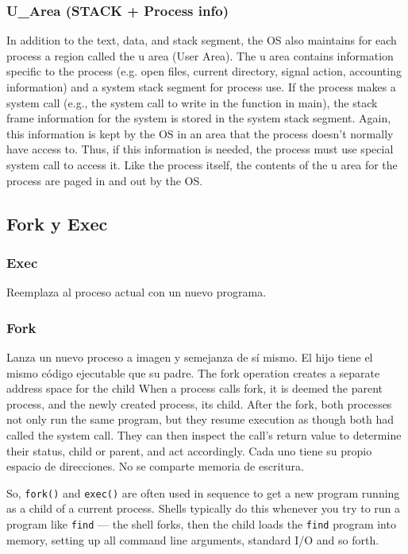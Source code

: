 \documentclass[a4paper, twoside]{article}
\begin{document}
\subsubsection{U\_Area (STACK + Process info)}

In addition to the text, data, and stack segment, the OS also maintains for
each process a region called the u area (User Area).
The u area contains information specific to the process (e.g. open files,
current directory, signal action, accounting information) and a system stack
segment for process use.
If the process makes a system call (e.g., the system call to write in the
function in main), the stack frame information for the system is stored in
the system stack segment.
Again, this information is kept by the OS in an area that the process doesn't
normally have access to.
Thus, if this information is needed, the process must use special system call
to access it.
Like the process itself, the contents of the u area for the process are paged
in and out by the OS.

\subsection{Fork y Exec}

\subsubsection{Exec}

Reemplaza al proceso actual con un nuevo programa.

\subsubsection{Fork}

Lanza un nuevo proceso a imagen y semejanza de sí mismo.
El hijo tiene el mismo código ejecutable que su padre.
The fork operation creates a separate address space for the child
When a process calls fork, it is deemed the parent process, and the newly
created process, its child.
After the fork, both processes not only run the same program, but they resume
execution as though both had called the system call.
They can then inspect the call's return value to determine their status,
child or parent, and act accordingly.
Cada uno tiene su propio espacio de direcciones.
No se comparte memoria de escritura.

So, \texttt{fork()} and \texttt{exec()} are often used in sequence to get a new
program running as a child of a current process.
Shells typically do this whenever you try to run a program like \texttt{find}
--- the shell forks, then the child loads the \texttt{find} program into memory,
setting up all command line arguments, standard I/O and so forth.\\
\end{document}
